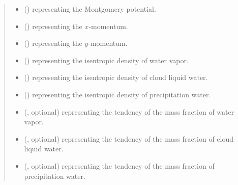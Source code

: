 \documentclass[letterpaper,10pt,english]{sphinxmanual}
\begin{document}
\begin{fulllineitems}
\begin{fulllineitems}
\begin{quote}
\begin{description}
\begin{itemize}
\item {} 
 () \textendash{}  representing the Montgomery potential.

\item {} 
 () \textendash{}  representing the \(x\)-momentum.

\item {} 
 () \textendash{}  representing the \(y\)-momentum.

\item {} 
 () \textendash{}  representing the isentropic density of water vapor.

\item {} 
 () \textendash{}  representing the isentropic density of cloud liquid water.

\item {} 
 () \textendash{}  representing the isentropic density of precipitation water.

\item {} 
 (, optional) \textendash{}  representing the tendency of the mass fraction of water vapor.

\item {} 
 (, optional) \textendash{}  representing the tendency of the mass fraction of cloud liquid water.

\item {} 
 (, optional) \textendash{}  representing the tendency of the mass fraction of precipitation water.

\end{itemize}

\end{description}\end{quote}

\end{fulllineitems}


\end{fulllineitems}
\end{document}

